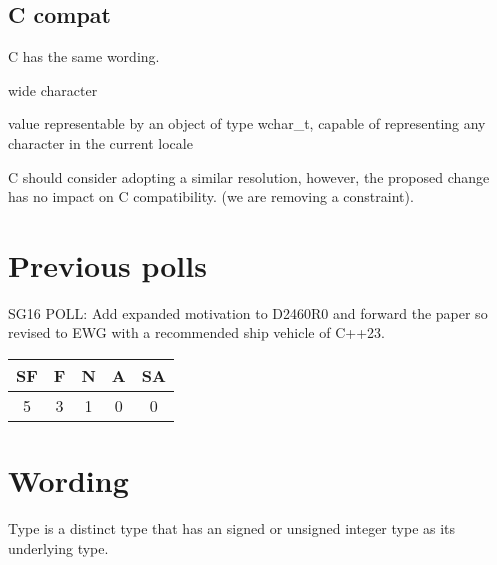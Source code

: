 \documentclass{wg21}
\begin{document}
\subsection{C compat}

C has the same wording.

\begin{quoteblock}
wide character

value representable by an object of type wchar_t, capable of representing any character in the current locale
\end{quoteblock}

C should consider adopting a similar resolution, however, the proposed change has no impact on C compatibility.
(we are removing a constraint).


\section{Previous polls}


\begin{quoteblock}
SG16 POLL: Add expanded motivation to D2460R0 and forward the paper so
revised to EWG with a recommended ship vehicle of C++23.
    
\begin{tabular}{|c|c|c|c|c|}
    \hline
    SF & F & N & A & SA\\
    \hline
     5 & 3 & 1 & 0 & 0 \\
    \hline
\end{tabular}
\end{quoteblock}



\section{Wording}


\pnum
{}%
%
%
Type  is a distinct type that has
an 
signed or unsigned integer type as its underlying type.


\end{document}

